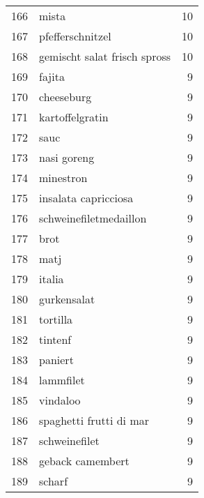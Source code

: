 \begin{tabular}{llr}
166  &                                              mista &     10 \\
167  &                                   pfefferschnitzel &     10 \\
168  &                       gemischt salat frisch spross &     10 \\
169  &                                             fajita &      9 \\
170  &                                         cheeseburg &      9 \\
171  &                                    kartoffelgratin &      9 \\
172  &                                               sauc &      9 \\
173  &                                        nasi goreng &      9 \\
174  &                                          minestron &      9 \\
175  &                               insalata capricciosa &      9 \\
176  &                             schweinefiletmedaillon &      9 \\
177  &                                               brot &      9 \\
178  &                                               matj &      9 \\
179  &                                             italia &      9 \\
180  &                                        gurkensalat &      9 \\
181  &                                           tortilla &      9 \\
182  &                                            tintenf &      9 \\
183  &                                            paniert &      9 \\
184  &                                          lammfilet &      9 \\
185  &                                           vindaloo &      9 \\
186  &                            spaghetti frutti di mar &      9 \\
187  &                                      schweinefilet &      9 \\
188  &                                   geback camembert &      9 \\
189  &                                             scharf &      9 \\

\end{tabular}
